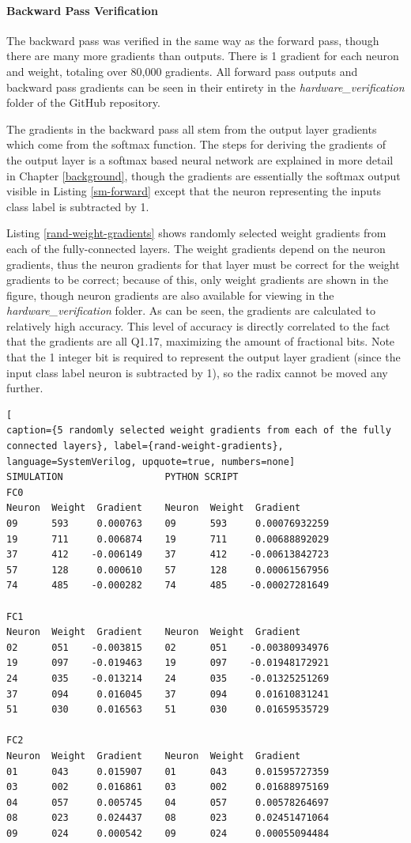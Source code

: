 \paragraph{Backward Pass Verification}
The backward pass was verified in the same way as the forward pass, though there are many more gradients than outputs. There is 1 gradient for each neuron and weight, totaling over 80,000 gradients. All forward pass outputs and backward pass gradients can be seen in their entirety in the \textit{hardware\_verification} folder of the GitHub repository.

The gradients in the backward pass all stem from the output layer gradients which come from the softmax function. The steps for deriving the gradients of the output layer is a softmax based neural network are explained in more detail in Chapter \ref{background}, though the gradients are essentially the softmax output visible in Listing \ref{sm-forward} except that the neuron representing the inputs class label is subtracted by 1. 

Listing \ref{rand-weight-gradients} shows randomly selected weight gradients from each of the fully-connected layers. The weight gradients depend on the neuron gradients, thus the neuron gradients for that layer must be correct for the weight gradients to be correct; because of this, only weight gradients are shown in the figure, though neuron gradients are also available for viewing in the \textit{hardware\_verification} folder. As can be seen, the gradients are calculated to relatively high accuracy. This level of accuracy is directly correlated to the fact that the gradients are all Q1.17, maximizing the amount of fractional bits. Note that the 1 integer bit is required to represent the output layer gradient (since the input class label neuron is subtracted by 1), so the radix cannot be moved any further.


\begin{lstlisting}[
caption={5 randomly selected weight gradients from each of the fully connected layers}, label={rand-weight-gradients}, language=SystemVerilog, upquote=true, numbers=none]
SIMULATION                  PYTHON SCRIPT
FC0
Neuron	Weight	Gradient	Neuron	Weight 	Gradient
09 		593 	0.000763    09   	593 	0.00076932259
19 		711 	0.006874    19 		711	 	0.00688892029
37 		412    -0.006149    37  	412    -0.00613842723
57 		128 	0.000610    57  	128 	0.00061567956
74 		485    -0.000282    74  	485    -0.00027281649

FC1
Neuron	Weight	Gradient	Neuron	Weight 	Gradient
02 		051    -0.003815    02   	051    -0.00380934976
19 		097    -0.019463    19  	097    -0.01948172921
24 		035    -0.013214    24  	035    -0.01325251269
37 		094 	0.016045    37  	094  	0.01610831241
51 		030 	0.016563    51  	030  	0.01659535729

FC2
Neuron	Weight	Gradient	Neuron	Weight 	Gradient
01  	043 	0.015907    01 		043 	0.01595727359
03  	002 	0.016861    03 		002  	0.01688975169
04  	057 	0.005745    04 		057 	0.00578264697
08  	023 	0.024437    08 		023 	0.02451471064
09  	024 	0.000542    09 		024 	0.00055094484
\end{lstlisting}
